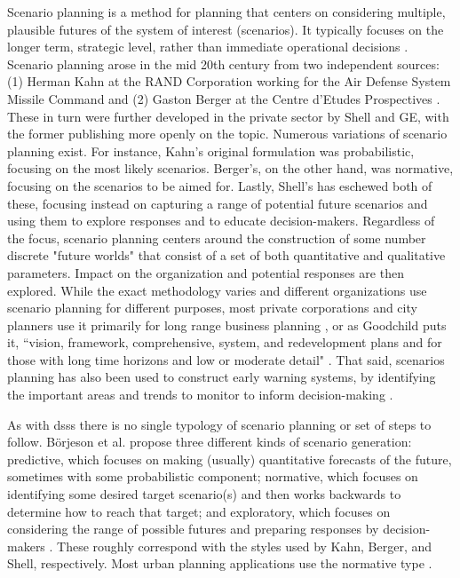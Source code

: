 Scenario planning is a method for planning that centers on considering multiple, plausible futures of the system of interest (scenarios). It typically focuses on the longer term, strategic level, rather than immediate operational decisions \cite{goodspeedScenarioPlanningCities2020}. Scenario planning arose in the mid 20th century from two independent sources: (1) Herman Kahn at the RAND Corporation working for the Air Defense System Missile Command and (2) Gaston Berger at the Centre d'Etudes Prospectives \cite{bradfieldOriginsEvolutionScenario2005}. These in turn were further developed in the private sector by Shell and GE, with the former publishing more openly on the topic. Numerous variations of scenario planning exist. For instance, Kahn's original formulation was probabilistic, focusing on the most likely scenarios. Berger's, on the other hand, was normative, focusing on the scenarios to be aimed for. Lastly, Shell's has eschewed both of these, focusing instead on capturing a range of potential future scenarios and using them to explore responses and to educate decision-makers. Regardless of the focus, scenario planning centers around the construction of some number discrete "future worlds" that consist of a set of both quantitative and qualitative parameters. Impact on the organization and potential responses are then explored. While the exact methodology varies and different organizations use scenario planning for different purposes, most private corporations and city planners use it primarily for long range business planning \cite{bradfieldOriginsEvolutionScenario2005}, or as Goodchild puts it, ``vision, framework, comprehensive, system, and redevelopment plans and for those with long time horizons and low or moderate detail" \cite{goodspeedScenarioPlanningCities2020}. That said, scenarios planning has also been used to construct early warning systems, by identifying the important areas and trends to monitor to inform decision-making \cite{tessunScenarioAnalysisEarly1997}.

As with \acp{dss} there is no single typology of scenario planning or set of steps to follow. Börjeson et al. propose three different kinds of scenario generation: predictive, which focuses on making (usually) quantitative forecasts of the future, sometimes with some probabilistic component; normative, which focuses on identifying some desired target scenario(s) and then works backwards to determine how to reach that target; and exploratory, which focuses on considering the range of possible futures and preparing responses by decision-makers \cite{borjesonScenarioTypesTechniques2006}. These roughly correspond with the styles used by Kahn, Berger, and Shell, respectively. Most urban planning applications use the normative type \cite{avinUsingExploratoryScenarios2020}. 

